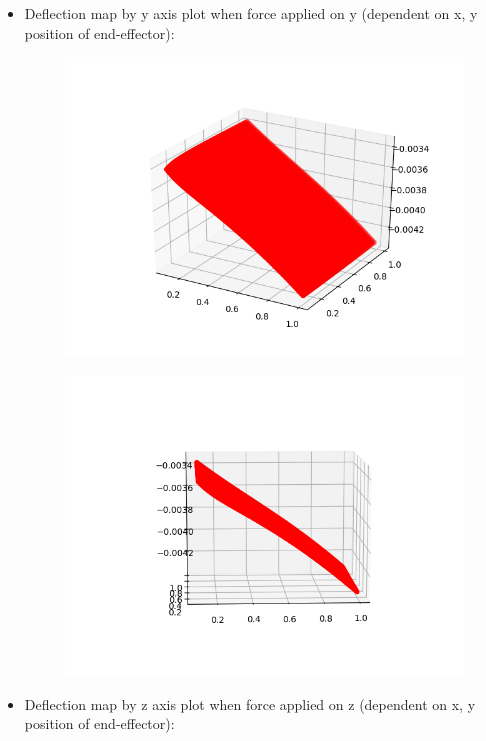 \documentclass[12pt]{article}
\begin{document}
\begin{itemize}
		\item Deflection map by y axis plot when force applied on y (dependent on x, y position of end-effector): 
		
		\begin{figure}[H]
			\includegraphics[scale=0.5]{y1.png}
		\end{figure}
		\begin{figure}[H]
			\includegraphics[scale=0.5]{y2.png}
		\end{figure}
	
		\item Deflection map by z axis plot when force applied on z (dependent on x, y position of end-effector): 
		

\end{itemize}
\end{document}
